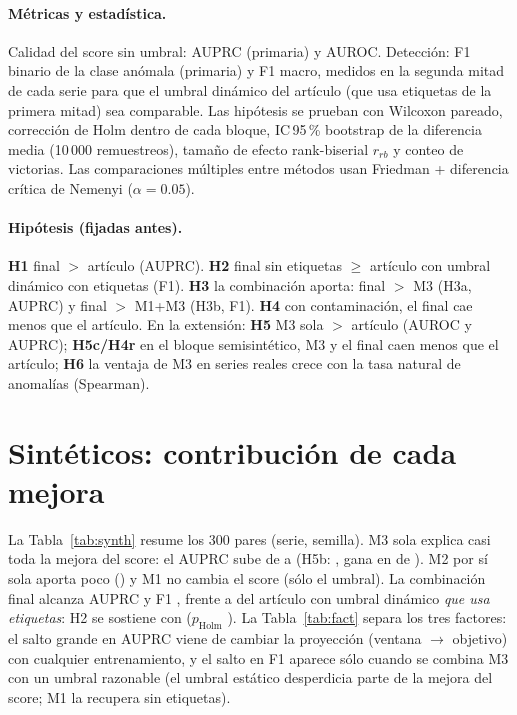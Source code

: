 \documentclass[10pt,a4paper]{article}
\newcommand{\MI}{M1}\newcommand{\MII}{M2}\newcommand{\MIII}{M3}
\begin{document}
\paragraph{Métricas y estadística.} Calidad del score sin umbral: AUPRC (primaria) y AUROC. Detección: F1
binario de la clase anómala (primaria) y F1 macro, medidos en la segunda mitad de cada serie para que el
umbral dinámico del artículo (que usa etiquetas de la primera mitad) sea comparable. Las hipótesis se prueban
con Wilcoxon pareado, corrección de Holm dentro de cada bloque, IC\,95\,\% bootstrap de la diferencia media
(10\,000 remuestreos), tamaño de efecto rank-biserial $r_{rb}$ y conteo de victorias. Las comparaciones
múltiples entre métodos usan Friedman + diferencia crítica de Nemenyi ($\alpha=0.05$).

\paragraph{Hipótesis (fijadas antes).} \textbf{H1} final $>$ artículo (AUPRC). \textbf{H2} final sin etiquetas
$\geq$ artículo con umbral dinámico con etiquetas (F1). \textbf{H3} la combinación aporta: final $>$ \MIII{}
(H3a, AUPRC) y final $>$ \MI+\MIII{} (H3b, F1). \textbf{H4} con contaminación, el final cae menos que el
artículo. En la extensión: \textbf{H5} \MIII{} sola $>$ artículo (AUROC y AUPRC); \textbf{H5c/H4r} en el bloque
semisintético, \MIII{} y el final caen menos que el artículo; \textbf{H6} la ventaja de \MIII{} en series reales
crece con la tasa natural de anomalías (Spearman).

\section{Sintéticos: contribución de cada mejora}

La Tabla~\ref{tab:synth} resume los 300 pares (serie, semilla). \MIII{} sola explica casi toda la mejora del
score: el AUPRC sube de  a  (H5b: 
, gana en  de ). \MII{} por sí sola aporta poco
() y \MI{} no cambia el score (sólo el umbral). La combinación final alcanza AUPRC
 y F1 , frente a  del artículo con umbral
dinámico \emph{que usa etiquetas}: H2 se sostiene con  
($p_{\text{Holm}}$ ). La Tabla~\ref{tab:fact} separa los tres factores: el salto grande en
AUPRC viene de cambiar la proyección (ventana $\to$ objetivo) con cualquier entrenamiento, y el salto en F1
aparece sólo cuando se combina \MIII{} con un umbral razonable (el umbral estático desperdicia parte de la
mejora del score; \MI{} la recupera sin etiquetas).
\end{document}
